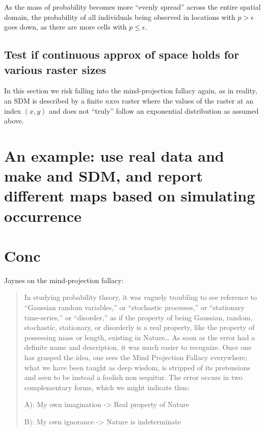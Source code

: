 \documentclass[10pt,oneside]{article}
\begin{document}
As the mass of probability becomes more ``evenly spread'' across the
entire spatial domain, the probability of all individuals being observed
in locations with \(p > \epsilon\) goes down, as there are more cells
with \(p \leq \epsilon\).

\hypertarget{test-if-continuous-approx-of-space-holds-for-various-raster-sizes}{%
\subsection{Test if continuous approx of space holds for various raster
sizes}\label{test-if-continuous-approx-of-space-holds-for-various-raster-sizes}}

In this section we risk falling into the mind-projection fallacy again,
as in reality, an SDM is described by a finite \(n\)x\(m\) raster where
the values of the raster at an index \((x,y)\) and does not ``truly''
follow an exponential distribution as assumed above.

\hypertarget{an-example-use-real-data-and-make-and-sdm-and-report-different-maps-based-on-simulating-occurrence}{%
\section{An example: use real data and make and SDM, and report
different maps based on simulating
occurrence}\label{an-example-use-real-data-and-make-and-sdm-and-report-different-maps-based-on-simulating-occurrence}}

\hypertarget{conc}{%
\section{Conc}\label{conc}}

Jaynes on the mind-projection fallacy:

\begin{quote}
In studying probability theory, it was vaguely troubling to see
reference to ``Gaussian random variables,'' or ``stochastic processes,''
or ``stationary time-series,'' or ``disorder,'' as if the property of
being Gaussian, random, stochastic, stationary, or disorderly is a real
property, like the property of possessing mass or length, existing in
Nature\ldots{} As soon as the error had a definite name and description,
it was much easier to recognize. Once one has grasped the idea, one sees
the Mind Projection Fallacy everywhere; what we have been taught as deep
wisdom, is stripped of its pretensions and seen to be instead a foolish
non sequitur. The error occurs in two complementary forms, which we
might indicate thus:

A): My own imagination -\textgreater{} Real property of Nature

B): My own ignorance -\textgreater{} Nature is indeterminate
\end{quote}
\end{document}
